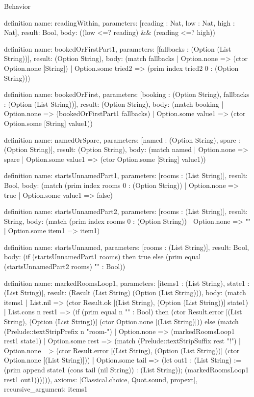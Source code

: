 \begin{lexlean}{Behavior}
\begin{semanticmodule}
definition{
  name: readingWithin,
  parameters: [reading : Nat, low : Nat, high : Nat],
  result: Bool,
  body: ((low <=? reading) && (reading <=? high))
}

definition{
  name: bookedOrFirstPart1,
  parameters: [fallbacks : (Option (List String))],
  result: (Option String),
  body: (match fallbacks
    | Option.none => (ctor Option.none [String])
    | Option.some tried2 => (prim index tried2 0 : (Option String)))
}

definition{
  name: bookedOrFirst,
  parameters: [booking : (Option String), fallbacks : (Option (List String))],
  result: (Option String),
  body: (match booking
    | Option.none => (bookedOrFirstPart1 fallbacks)
    | Option.some value1 => (ctor Option.some [String] value1))
}

definition{
  name: namedOrSpare,
  parameters: [named : (Option String), spare : (Option String)],
  result: (Option String),
  body: (match named
    | Option.none => spare
    | Option.some value1 => (ctor Option.some [String] value1))
}

definition{
  name: startsUnnamedPart1,
  parameters: [rooms : (List String)],
  result: Bool,
  body: (match (prim index rooms 0 : (Option String))
    | Option.none => true
    | Option.some value1 => false)
}

definition{
  name: startsUnnamedPart2,
  parameters: [rooms : (List String)],
  result: String,
  body: (match (prim index rooms 0 : (Option String))
    | Option.none => ""
    | Option.some item1 => item1)
}

definition{
  name: startsUnnamed,
  parameters: [rooms : (List String)],
  result: Bool,
  body: (if (startsUnnamedPart1 rooms) then true else (prim equal (startsUnnamedPart2 rooms) "" : Bool))
}

definition{
  name: markedRoomsLoop1,
  parameters: [items1 : (List String), state1 : (List String)],
  result: (Result (List String) (Option (List String))),
  body: (match items1
    | List.nil => (ctor Result.ok [(List String), (Option (List String))] state1)
    | List.cons n rest1 => (if (prim equal n "" : Bool) then (ctor Result.error [(List String), (Option (List String))] (ctor Option.none [(List String)])) else (match (Prelude::textStripPrefix n "room-")
      | Option.none => (markedRoomsLoop1 rest1 state1)
      | Option.some rest => (match (Prelude::textStripSuffix rest "!")
        | Option.none => (ctor Result.error [(List String), (Option (List String))] (ctor Option.none [(List String)]))
        | Option.some tail => (let out1 : (List String) := (prim append state1 (cons tail (nil String)) : (List String)); (markedRoomsLoop1 rest1 out1)))))),
  axioms: [Classical.choice, Quot.sound, propext],
  recursive_argument: items1
}


\end{semanticmodule}
\end{lexlean}

